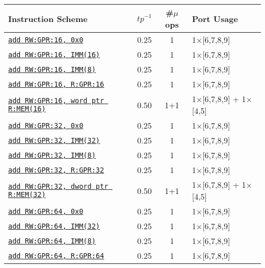 \documentclass[a4paper,english,fontsize=9]{scrartcl}
\begin{document}
\begin{longtable}{p{}ccL{.25\textwidth}}
  \toprule
  \textbf{Instruction Scheme} & \(\mathit{tp}^{-1}\) & \textbf{\#\(\mu\)ops} & \textbf{Port Usage}\\
  \toprule
  \endhead
    \texttt{\href{https://felixcloutier.com/x86/ADD.html}{add RW:GPR:16, 0x0}} & 0.25 & 1 & 1\(\times\)[6,7,8,9] \\
  \midrule
  \texttt{\href{https://felixcloutier.com/x86/ADD.html}{add RW:GPR:16, IMM(16)}} & 0.25 & 1 & 1\(\times\)[6,7,8,9] \\
  \midrule
  \texttt{\href{https://felixcloutier.com/x86/ADD.html}{add RW:GPR:16, IMM(8)}} & 0.25 & 1 & 1\(\times\)[6,7,8,9] \\
  \midrule
  \texttt{\href{https://felixcloutier.com/x86/ADD.html}{add RW:GPR:16, R:GPR:16}} & 0.25 & 1 & 1\(\times\)[6,7,8,9] \\
  \midrule
  \texttt{\href{https://felixcloutier.com/x86/ADD.html}{add RW:GPR:16, word ptr R:MEM(16)}} & 0.50 & 1+1 & 1\(\times\)[6,7,8,9] + 1\(\times\)[4,5] \\
  \midrule
  \texttt{\href{https://felixcloutier.com/x86/ADD.html}{add RW:GPR:32, 0x0}} & 0.25 & 1 & 1\(\times\)[6,7,8,9] \\
  \midrule
  \texttt{\href{https://felixcloutier.com/x86/ADD.html}{add RW:GPR:32, IMM(32)}} & 0.25 & 1 & 1\(\times\)[6,7,8,9] \\
  \midrule
  \texttt{\href{https://felixcloutier.com/x86/ADD.html}{add RW:GPR:32, IMM(8)}} & 0.25 & 1 & 1\(\times\)[6,7,8,9] \\
  \midrule
  \texttt{\href{https://felixcloutier.com/x86/ADD.html}{add RW:GPR:32, R:GPR:32}} & 0.25 & 1 & 1\(\times\)[6,7,8,9] \\
  \midrule
  \texttt{\href{https://felixcloutier.com/x86/ADD.html}{add RW:GPR:32, dword ptr R:MEM(32)}} & 0.50 & 1+1 & 1\(\times\)[6,7,8,9] + 1\(\times\)[4,5] \\
  \midrule
  \texttt{\href{https://felixcloutier.com/x86/ADD.html}{add RW:GPR:64, 0x0}} & 0.25 & 1 & 1\(\times\)[6,7,8,9] \\
  \midrule
  \texttt{\href{https://felixcloutier.com/x86/ADD.html}{add RW:GPR:64, IMM(32)}} & 0.25 & 1 & 1\(\times\)[6,7,8,9] \\
  \midrule
  \texttt{\href{https://felixcloutier.com/x86/ADD.html}{add RW:GPR:64, IMM(8)}} & 0.25 & 1 & 1\(\times\)[6,7,8,9] \\
  \midrule
  \texttt{\href{https://felixcloutier.com/x86/ADD.html}{add RW:GPR:64, R:GPR:64}} & 0.25 & 1 & 1\(\times\)[6,7,8,9] \\

\end{longtable}
\end{document}
